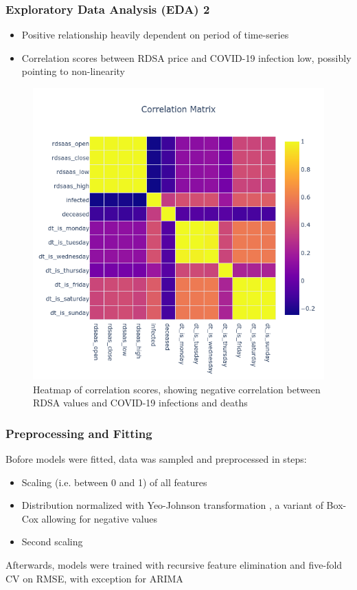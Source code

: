 \documentclass[aspectratio=169,classic]{uva-inf-presentation}
\begin{document}
\begin{frame}
\frametitle{Exploratory Data Analysis (EDA) 2}
\begin{itemize}
    \item Positive relationship heavily dependent on period of time-series
    \item Correlation scores between RDSA price and COVID-19 infection low, possibly pointing to non-linearity
\end{itemize}
\begin{figure}\centering
    \includegraphics[trim=0cm 0.5cm 0 -6.5cm, scale=0.25]{images/corrplot.png}
    \caption{Heatmap of correlation scores, showing negative correlation between RDSA values and COVID-19 infections and deaths}
\end{figure}
\end{frame}

\onecolumn

\begin{frame}
\frametitle{Preprocessing and Fitting}
Bofore models were fitted, data was sampled and preprocessed in steps:
\begin{itemize}
    \item Scaling (i.e. between 0 and 1) of all features
    \item Distribution normalized with Yeo-Johnson transformation \cite{yeo2000new}, a variant of Box-Cox allowing for negative values
    \item Second scaling
\end{itemize}
Afterwards, models were trained with recursive feature elimination and five-fold CV on RMSE, with exception for ARIMA
\end{frame}
\end{document}
